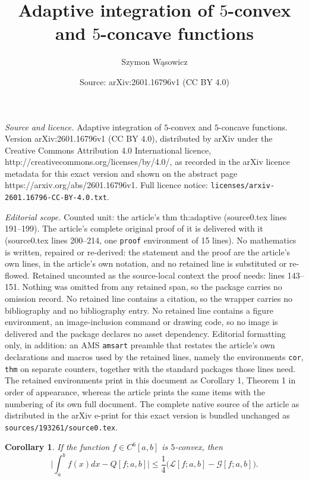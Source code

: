 \documentclass[10pt,a4paper]{amsart}
\title{Adaptive integration of $5$-convex and $5$-concave functions}
\author{Szymon W\k{a}sowicz}
\date{Source: arXiv:2601.16796v1 (CC BY 4.0)}
\newtheorem{cor}{Corollary}
\newcommand{\G}{\mathcal{G}}
\newcommand{\Lob}{\mathcal{L}}
\newcommand{\xle}{\leqslant}
\begin{document}
\maketitle

\noindent\emph{Source and licence.} Adaptive integration of $5$-convex and $5$-concave functions. Version arXiv:2601.16796v1 (CC BY 4.0), distributed by arXiv under the Creative Commons Attribution 4.0 International licence, http://creativecommons.org/licenses/by/4.0/, as recorded in the arXiv licence metadata for this exact version and shown on the abstract page https://arxiv.org/abs/2601.16796v1. Full licence notice: \texttt{licenses/arxiv-2601.16796-CC-BY-4.0.txt}.\par\smallskip

\noindent\textit{Editorial scope.} Counted unit: the article's thm th:adaptive (source0.tex lines 191--199). The article's complete original proof of it is delivered with it (source0.tex lines 200--214, one \texttt{proof} environment of 15 lines). No mathematics is written, repaired or re-derived: the statement and the proof are the article's own lines, in the article's own notation, and no retained line is substituted or re-flowed.  Retained uncounted as the source-local context the proof needs: lines 143--151.  Nothing was omitted from any retained span, so the package carries no omission record.  No retained line contains a citation, so the wrapper carries no bibliography and no bibliography entry.  No retained line contains a figure environment, an image-inclusion command or drawing code, so no image is delivered and the package declares no asset dependency.  Editorial formatting only, in addition: an AMS \texttt{amsart} preamble that restates the article's own declarations and macros used by the retained lines, namely the environments \texttt{cor}, \texttt{thm} on separate counters, together with the standard packages those lines need.  The retained environments print in this document as Corollary 1, Theorem 1 in order of appearance, whereas the article prints the same items with the numbering of its own full document.  The complete native source of the article as distributed in the arXiv e-print for this exact version is bundled unchanged as \texttt{sources/193261/source0.tex}.
\begin{cor}\label{cor:Q}
 If the function $f\in C^6[a,b]$ is $5$-convex, then
 \[
  \biggl|
   \int_a^b f(x) dx - Q[f;a,b]
  \biggr| \xle
  \frac{1}{4}\bigl(\Lob[f;a,b] - \G[f;a,b] \bigr).
 \]
\end{cor}
\end{document}
